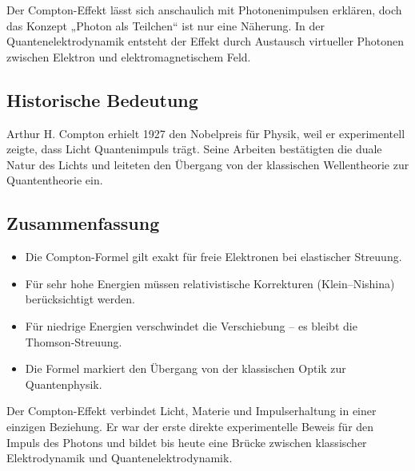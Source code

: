 \begin{DidaktikBox}
	Der Compton-Effekt lässt sich anschaulich mit Photonenimpulsen erklären,
	doch das Konzept „Photon als Teilchen“ ist nur eine Näherung.
	In der Quantenelektrodynamik entsteht der Effekt durch Austausch virtueller Photonen
	zwischen Elektron und elektromagnetischem Feld.
\end{DidaktikBox}

\subsection{Historische Bedeutung}

\begin{HistoryBox}
	Arthur H. Compton erhielt 1927 den Nobelpreis für Physik,
	weil er experimentell zeigte, dass Licht Quantenimpuls trägt.
	Seine Arbeiten bestätigten die duale Natur des Lichts und leiteten
	den Übergang von der klassischen Wellentheorie zur Quantentheorie ein.
\end{HistoryBox}

\subsection*{Zusammenfassung}

\begin{itemize}
	\item Die Compton-Formel gilt exakt für freie Elektronen bei elastischer Streuung.
	\item Für sehr hohe Energien müssen relativistische Korrekturen (Klein–Nishina) berücksichtigt werden.
	\item Für niedrige Energien verschwindet die Verschiebung – es bleibt die Thomson-Streuung.
	\item Die Formel markiert den Übergang von der klassischen Optik zur Quantenphysik.
\end{itemize}

\begin{PhysikBox}
	Der Compton-Effekt verbindet Licht, Materie und Impulserhaltung in einer einzigen Beziehung.
	Er war der erste direkte experimentelle Beweis für den Impuls des Photons
	und bildet bis heute eine Brücke zwischen klassischer Elektrodynamik
	und Quantenelektrodynamik.
\end{PhysikBox}
